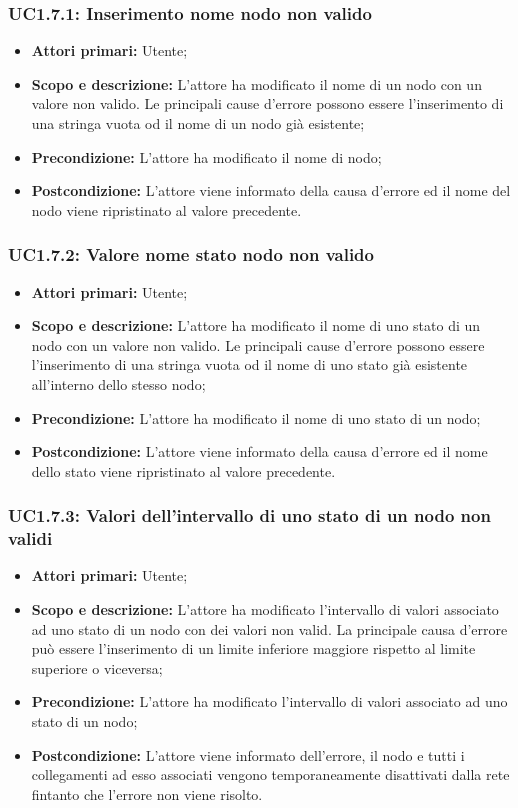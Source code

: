 \subsubsection{UC1.7.1: Inserimento nome nodo non valido} 
\begin{itemize} 
	\item{\textbf{Attori primari:} Utente;} 
	\item{\textbf{Scopo e descrizione:} L'attore ha modificato il nome di un nodo con un valore non valido. Le principali cause d'errore possono essere l'inserimento di una stringa vuota od il nome di un nodo già esistente;} 
	\item{\textbf{Precondizione:} L'attore ha modificato il nome di nodo;} 
	\item{\textbf{Postcondizione:} L'attore viene informato della causa d'errore ed il nome del nodo viene ripristinato al valore precedente.} 
\end{itemize} 
\subsubsection{UC1.7.2: Valore nome stato nodo non valido} 
\begin{itemize} 
	\item{\textbf{Attori primari:} Utente;} 
	\item{\textbf{Scopo e descrizione:} L'attore ha modificato il nome di uno stato di un nodo con un valore non valido. Le principali cause d'errore possono essere l'inserimento di una stringa vuota od il nome di uno stato già esistente all'interno dello stesso nodo;} 
	\item{\textbf{Precondizione:} L'attore ha modificato il nome di uno stato di un nodo;} 
	\item{\textbf{Postcondizione:} L'attore viene informato della causa d'errore ed il nome dello stato viene ripristinato al valore precedente.} 
\end{itemize} 
\subsubsection{UC1.7.3: Valori dell'intervallo di uno stato di un nodo non validi} 
\begin{itemize} 
	\item{\textbf{Attori primari:} Utente;} 
	\item{\textbf{Scopo e descrizione:} L'attore ha modificato l'intervallo di valori associato ad uno stato di un nodo con dei valori non valid. La principale causa d'errore può essere l'inserimento di un limite inferiore maggiore rispetto al limite superiore o viceversa;} 
	\item{\textbf{Precondizione:} L'attore ha modificato l'intervallo di valori associato ad uno stato di un nodo;} 
	\item{\textbf{Postcondizione:} L'attore viene informato dell'errore, il nodo e tutti i collegamenti ad esso associati vengono temporaneamente disattivati dalla rete fintanto che l'errore non viene risolto.} 
\end{itemize} 
